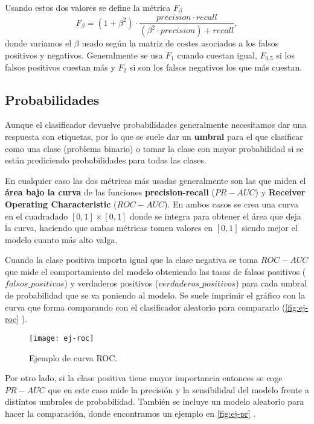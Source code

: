 Usando estos dos valores se define la métrica $F_\beta$
\begin{equation}
  F_\beta = (1 + \beta^2) \cdot \dfrac{precision \cdot recall}{(\beta^2 \cdot precision) + recall},
  \label{eq:fscore}
\end{equation}
donde variamos el $\beta$ usado según la matriz de costes asociados a los falsos positivos y negativos. Generalmente se usa $F_1$ cuando cuestan igual, $F_{0.5}$ si los falsos positivos cuestan más y $F_{2}$ si son los falsos negativos los que más cuestan.

\subsection{Probabilidades}

Aunque el clasificador devuelve probabilidades generalmente necesitamos dar una respuesta con etiquetas, por lo que se suele dar un \textbf{umbral} para el que clasificar como una clase (problema binario) o tomar la clase con mayor probabilidad si se están prediciendo probabilidades para todas las clases.

En cualquier caso las dos métricas más usadas generalmente son las que miden el \textbf{área bajo la curva} de las funciones \textbf{precision-recall} ($PR-AUC$) y \textbf{Receiver Operating Characteristic} ($ROC-AUC$). En ambos casos se crea una curva en el cuadradado $[0,1] \times [0,1]$ donde se integra para obtener el área que deja la curva, haciendo que ambas métricas tomen valores en $[0, 1]$ siendo mejor el modelo cuanto más alto valga.

Cuando la clase positiva importa igual que la clase negativa se toma $ROC-AUC$ que mide el comportamiento del modelo obteniendo las tasas de falsos positivos ($falsos\_positivos$) y verdaderos positivos ($verdaderos\_positivos$) para cada umbral de probabilidad que se va poniendo al modelo. Se suele imprimir el gráfico con la curva que forma comparando con el clasificador aleatorio para compararlo (\autoref{fig:ej-roc} \cite{scikit2020roc}).

\begin{figure}[htpb]
  \centering
  \texttt{[image: ej-roc]}
  \caption{Ejemplo de curva ROC.}
  \label{fig:ej-roc}
\end{figure}

Por otro lado, si la clase positiva tiene mayor importancia entonces se coge $PR-AUC$ que en este caso mide la precisión y la sensibilidad del modelo frente a distintos umbrales de probabilidad. También se incluye un modelo aleatorio para hacer la comparación, donde encontramos un ejemplo en \autoref{fig:ej-pr} \cite{scikit2020pr}.

